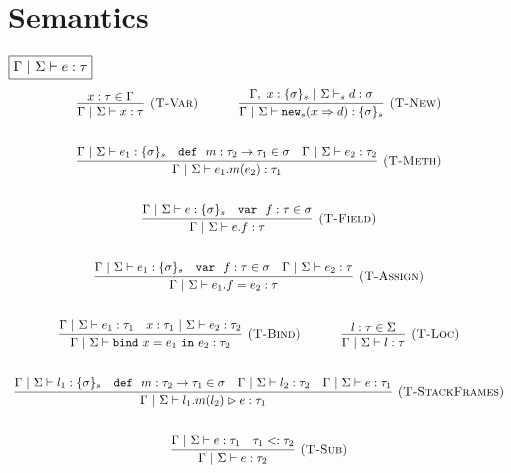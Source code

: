 \documentclass{llncs}
\newcommand{\keywadj}[1]{\mathtt{#1}}
\newcommand{\keyw}[1]{\keywadj{#1}~}
\begin{document}
\newpage

\section{Semantics}

$\fbox{$\Gamma~|~\Sigma \vdash e : \tau$}$
\[
\begin{array}{c}
\infer[\textsc{(T-Var)}]
  {\Gamma~|~\Sigma \vdash x : \tau}
  {x : \tau \in \Gamma}%
~~~~~~~~~~
\infer[\textsc{(T-New)}]
	{\Gamma~|~\Sigma \vdash \keywadj{new}_{s}(x \Rightarrow d) : \{ \sigma \}_{s}}
	{\Gamma,~x : \{ \sigma \}_{s}~|~\Sigma \vdash_s d : \sigma} \\[5ex]

\infer[\textsc{(T-Meth)}]
	{\Gamma~|~\Sigma \vdash e_1.m(e_2) : \tau_1} 
	{\Gamma~|~\Sigma \vdash e_1 : \{\sigma\}_s  & \keyw{def}~ m : \tau_2 \rightarrow \tau_1 \in \sigma & \Gamma~|~\Sigma \vdash e_2 : \tau_2}\\[5ex]

\infer[\textsc{(T-Field)}]
	{\Gamma~|~\Sigma \vdash  e.f : \tau} 
	{\Gamma~|~\Sigma \vdash e : \{\sigma\}_s & \keyw{var}~ f : \tau \in \sigma}\\[5ex]
	
\infer[\textsc{(T-Assign)}]
	{\Gamma~|~\Sigma \vdash  e_1.f=e_2 : \tau} 
	{\Gamma~|~\Sigma \vdash e_1 : \{\sigma\}_s & \keyw{var}~ f : \tau \in \sigma & \Gamma~|~\Sigma \vdash e_2 : \tau}\\[5ex]

\infer[\textsc{(T-Bind)}]
  {\Gamma~|~\Sigma \vdash \keyw{bind} x = e_1~\keyw{in} e_2 : \tau_2}
  {\Gamma~|~\Sigma \vdash e_1 : \tau_1 & x : \tau_1~|~\Sigma \vdash e_2 : \tau_2}%
~~~~~~~~~~
\infer[\textsc{(T-Loc)}]
  {\Gamma~|~\Sigma \vdash l : \tau}
  {l : \tau \in \Sigma}\\[5ex]

\infer[\textsc{(T-StackFrames)}]
	{\Gamma~|~\Sigma \vdash l_1.m(l_2) \rhd e : \tau_1}
	{\Gamma~|~\Sigma \vdash l_1 : \{\sigma\}_s & \keyw{def}~ m : \tau_2 \rightarrow \tau_1 \in \sigma & \Gamma~|~\Sigma \vdash l_2 : \tau_2 & \Gamma~|~\Sigma \vdash e : \tau_1} \\[5ex]

\infer[\textsc{(T-Sub)}]
  {\Gamma~|~\Sigma \vdash e : \tau_2}
  {\Gamma~|~\Sigma \vdash e : \tau_1 & \tau_1 <: \tau_2}\\[5ex]

\end{array}
\]
\end{document}
